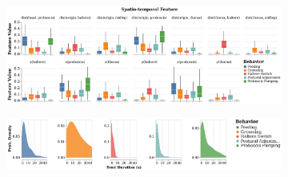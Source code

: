 \begin{figure}[ht!]
	\centering
	\begin{subfigure}[ht!]{0.90\linewidth}
		\centering
		\includegraphics[width=\linewidth]{figures/FeatureDistributions_perBehavior-Ann.pdf}
		\caption{}
	\end{subfigure}%

	\centering
	\begin{subfigure}[ht!]{0.90\linewidth}
		\centering
		\includegraphics[width=\linewidth]{figures/BoutDurationDistributions-Ann.pdf}
		\caption{}
	\end{subfigure}%
\end{figure}

